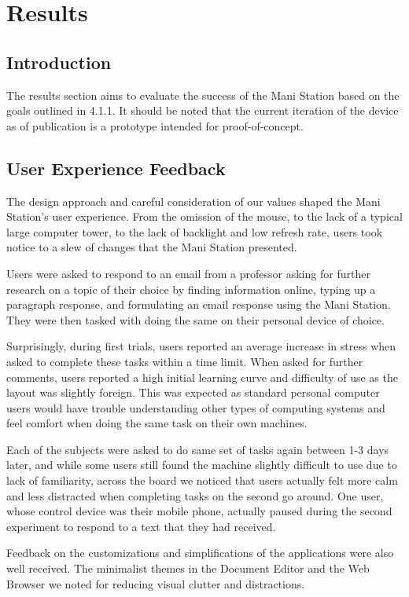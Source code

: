 \documentclass[letterpaper,twocolumn,10pt]{article}
\begin{document}
\section{Results}
\subsection{Introduction}
The results section aims to evaluate the success of the Mani Station based on the goals outlined in 4.1.1. It should be noted that the current iteration of the device as of publication is a prototype intended for proof-of-concept.
\subsection{User Experience Feedback}
The design approach and careful consideration of our values shaped the Mani Station’s user experience. From the omission of the mouse, to the lack of a typical large computer tower, to the lack of backlight and low refresh rate, users took notice to a slew of changes that the Mani Station presented.

Users were asked to respond to an email from a professor asking for further research on a topic of their choice by finding information online, typing up a paragraph response, and formulating an email response using the Mani Station. They were then tasked with doing the same on their personal device of choice.

Surprisingly, during first trials, users reported an average increase in stress when asked to complete these tasks within a time limit. When asked for further comments, users reported a high initial learning curve and difficulty of use as the layout was slightly foreign. This was expected as standard personal computer users would have trouble understanding other types of computing systems and feel comfort when doing the same task on their own machines.

Each of the subjects were asked to do same set of tasks again between 1-3 days later, and while some users still found the machine slightly difficult to use due to lack of familiarity, across the board we noticed that users actually felt more calm and less distracted when completing tasks on the second go around. One user, whose control device was their mobile phone, actually paused during the second experiment to respond to a text that they had received.

Feedback on the customizations and simplifications of the applications were also well received. The minimalist themes in the Document Editor and the Web Browser we noted for reducing visual clutter and distractions.
\end{document}
